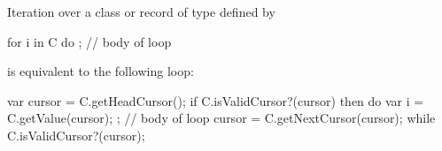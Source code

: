 Iteration over a class or record  of type 
defined by
\begin{chapel}
for i in C do
  ; // body of loop
\end{chapel}
is equivalent to the following loop:
\begin{chapel}
var cursor = C.getHeadCursor();
if C.isValidCursor?(cursor) then do {
  var i = C.getValue(cursor);
  ; // body of loop
  cursor = C.getNextCursor(cursor);
} while C.isValidCursor?(cursor);
\end{chapel}
